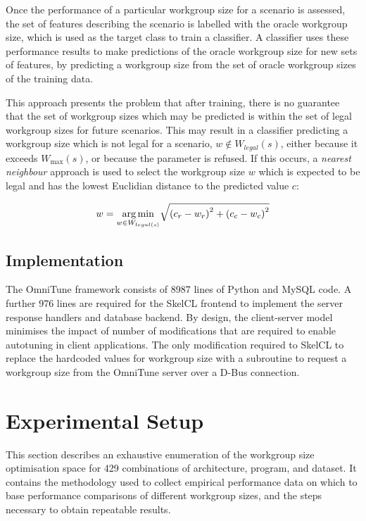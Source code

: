 \documentclass[nonatbib,preprint,9pt]{sigplanconf}
\begin{document}
Once the performance of a particular workgroup size for a scenario is
assessed, the set of features describing the scenario is labelled with
the oracle workgroup size, which is used as the target class to train
a classifier. A classifier uses these performance results to make
predictions of the oracle workgroup size for new sets of features, by
predicting a workgroup size from the set of oracle workgroup sizes of
the training data.

This approach presents the problem that after training, there is no
guarantee that the set of workgroup sizes which may be predicted is
within the set of legal workgroup sizes for future scenarios. This may
result in a classifier predicting a workgroup size which is not legal
for a scenario, $w \not\in W_{legal}(s)$, either because it exceeds
$W_{\max}(s)$, or because the parameter is refused. If this occurs, a
\emph{nearest neighbour} approach is used to select the workgroup size
$w$ which is expected to be legal and has the lowest Euclidian
distance to the predicted value $c$:

\begin{equation}
  w = \underset{w \in W_{legal(s)}}{\operatorname*{arg\,min}} \sqrt{\left(c_r - w_r\right)^2 + \left(c_c - w_c\right)^2}
\end{equation}

\subsection{Implementation}

The OmniTune framework consists of 8987 lines of Python and MySQL
code. A further 976 lines are required for the SkelCL frontend to
implement the server response handlers and database backend. By
design, the client-server model minimises the impact of number of
modifications that are required to enable autotuning in client
applications. The only modification required to SkelCL to replace the
hardcoded values for workgroup size with a subroutine to request a
workgroup size from the OmniTune server over a D-Bus connection.


\section{Experimental Setup}

This section describes an exhaustive enumeration of the workgroup size
optimisation space for 429 combinations of architecture, program, and
dataset. It contains the methodology used to collect empirical
performance data on which to base performance comparisons of different
workgroup sizes, and the steps necessary to obtain repeatable results.
\end{document}
